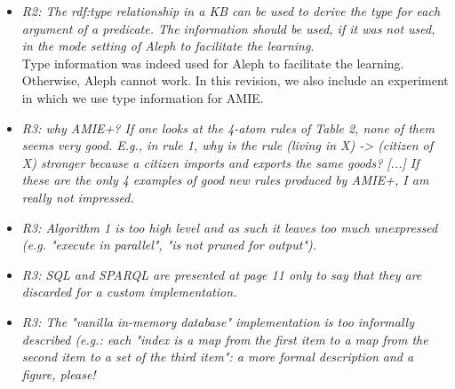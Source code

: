 \begin{figure*}[t!]
\begin{minipage}{.8\textwidth}
\begin{itemize}
      
      \item \textit{R2: The rdf:type relationship in a KB can be used to derive the type for each argument of a predicate. 
      The information should be used, if it was not used, in the mode setting of Aleph to facilitate the learning.\\  }
      Type information was indeed used for Aleph to facilitate the learning. Otherwise, Aleph cannot work. 
      In this revision, we also include an experiment in which we use type information for AMIE. 
      
         \end{itemize}
\end{minipage}
\end{figure*}

\begin{figure*}[t!]
\hspace{.1\textwidth}
\begin{minipage}{.8\textwidth}
\large 
     \begin{itemize}
     
      \item \textit{R3: why AMIE+? If one looks at the 4-atom rules of Table 2, none of them seems very good. 
      E.g., in rule 1, why is the rule (living in X) -> (citizen of X) stronger because a citizen imports and exports the same goods? [...] 
      If these are the only 4 examples of good new rules produced by AMIE+,  I am really not impressed.\\  }
      
      
     \item \textit{R3:  Algorithm 1 is too high level and as such it leaves too much unexpressed (e.g. "execute in parallel", "is not pruned for output").\\  }
     
     
      \item \textit{R3:  SQL and SPARQL are presented at page 11 only to say that they are discarded for a custom implementation.\\  }
      
      
      \item \textit{R3:  The "vanilla in-memory database" implementation is too informally described (e.g.: each "index is a map from the first item to a map from the second item to a set of the third item": 
      a more formal description and a figure, please!\\  }
      
      
        \end{itemize}
\end{minipage}
\end{figure*}

